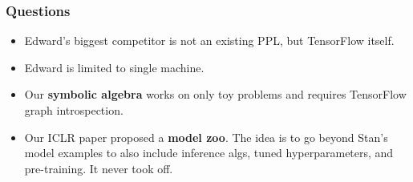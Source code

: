 \documentclass[10pt,
               xcolor={usenames,dvipsnames},
               hyperref={colorlinks,linktoc=all,citecolor=Plum,linkcolor=MidnightBlue,urlcolor=MidnightBlue},noamssymb]{beamer}
\begin{document}
\begin{frame}
\frametitle{Questions}
\begin{itemize}
\item
Edward's biggest competitor is not an existing PPL, but TensorFlow itself.

\item
Edward is limited to single machine.

\item
Our \textbf{symbolic algebra} works on only toy problems and requires
TensorFlow graph introspection.

\item
Our ICLR paper proposed a \textbf{model zoo}. The idea is to
go beyond Stan's model examples to also include
inference algs, tuned hyperparameters, and pre-training.
It never took off.

\end{itemize}
\end{frame}
\end{document}
